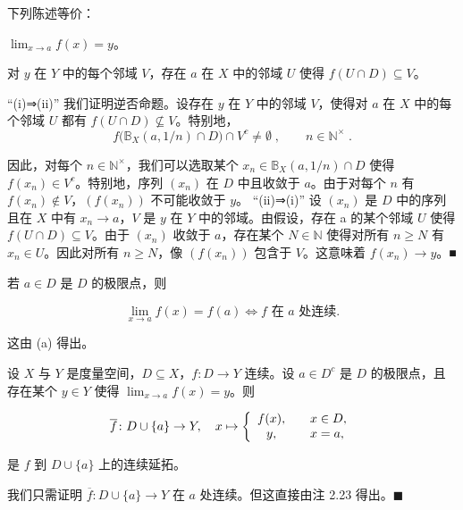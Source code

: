 \begin{remark}

\begin{items}
\item

下列陈述等价：

\begin{subitems}
\item

$ \lim_{x \to a} f(x) = y $。

\item

对 $ y $ 在 $ Y $ 中的每个邻域 $ V $，存在 $ a $ 在 $ X $ 中的邻域 $ U $ 使得 $ f(U \cap D) \subseteq V $。

\proofhead
“(i)⇒(ii)” 我们证明逆否命题。设存在 $y$ 在 $Y$ 中的邻域 $V$，使得对 $a$ 在 $X$ 中的每个邻域 $U$ 都有 $f(U \cap D) \not\subseteq V$。特别地，
\[
f\bigl(\mathbb{B}_{X}(a,1/n)\cap D\bigr)\cap V^{c}\neq\emptyset\;,\qquad n\in\mathbb{N}^{\times}\;.
\]

因此，对每个 $n \in \mathbb{N}^\times$，我们可以选取某个 $x_n \in \mathbb{B}_X(a,1/n) \cap D$ 使得 $f(x_n) \in V^c$。特别地，序列 $(x_n)$ 在 $D$ 中且收敛于 $a$。由于对每个 $n$ 有 $f(x_n) \notin V$，$(f(x_n))$ 不可能收敛于 $y$。
“(ii)⇒(i)” 设 $ (x_n) $ 是 $ D $ 中的序列且在 $ X $ 中有 $ x_n \to a $，$ V $ 是 $ y $ 在 $ Y $ 中的邻域。由假设，存在 a 的某个邻域 $ U $ 使得 $ f(U \cap D) \subseteq V $。由于 $ (x_n) $ 收敛于 $ a $，存在某个 $ N \in \mathbb{N} $ 使得对所有 $ n \geq N $ 有 $ x_n \in U $。因此对所有 $ n \geq N $，像 $ (f(x_n)) $ 包含于 $ V $。这意味着 $ f(x_n) \to y $。■

\end{subitems}

\item

若 $ a \in D $ 是 $ D $ 的极限点，则

\[
\lim_{x\to a}f(x)=f(a)\Longleftrightarrow f\text{ 在 }a\text{ 处连续}.
\]

\proofhead
这由 (a) 得出。
\end{items}

\end{remark}

\begin{proposition}

设 $X$ 与 $Y$ 是度量空间，$D \subseteq X$，$f: D \to Y$ 连续。设 $a \in D^c$ 是 $D$ 的极限点，且存在某个 $y \in Y$ 使得 $\lim_{x \to a} f(x) = y$。则

\begin{equation*}
\overline{f}\colon D\cup\{a\}\to Y,\quad x\mapsto\left\{\begin{array}{c l}{f(x),}&{\quad x\in D,}\\ {y,}&{\quad x=a,}\\ \end{array}\right.
\end{equation*}

是 $f$ 到 $D \cup \{a\}$ 上的连续延拓。

\proofhead
我们只需证明 $ \overline{f}\colon D\cup\{a\}\to Y $ 在 $ a $ 处连续。但这直接由注 2.23 得出。$ \blacksquare $
\end{proposition}

